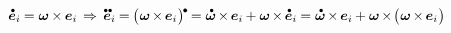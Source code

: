 \begin{otherlanguage}{russian}
\nopagebreak\begin{equation*}
\mathdotabove{\bm{e}}_i \hspace{-0.1ex} = \bm{\omega} \hspace{-0.1ex} \times \hspace{-0.12ex} \bm{e}_i
\hspace{.33ex} \Rightarrow \hspace{.4ex}
\mathdotdotabove{\bm{e}}_i \hspace{-0.1ex}
= \hspace{-0.15ex} \bigl( \hspace{.1ex} \bm{\omega} \hspace{-0.2ex} \times \hspace{-0.2ex} \bm{e}_i \hspace{.1ex} \bigr)^{ \hspace{-0.15ex} \tikz[baseline=-0.2ex] \draw[black, fill=black] (0,0) circle (.28ex); } \hspace{-0.15ex}
= \mathdotabove{\bm{\omega}} \hspace{-0.2ex} \times \hspace{-0.2ex} \bm{e}_i \hspace{-0.1ex} + \bm{\omega} \hspace{-0.2ex} \times \hspace{-0.2ex} \mathdotabove{\bm{e}}_i \hspace{-0.1ex}
= \mathdotabove{\bm{\omega}} \hspace{-0.2ex} \times \hspace{-0.2ex} \bm{e}_i \hspace{-0.1ex}
+ \bm{\omega} \hspace{-0.2ex} \times \hspace{-0.33ex} \bigl( \hspace{.1ex} \bm{\omega} \hspace{-0.2ex} \times \hspace{-0.2ex} \bm{e}_i \hspace{.1ex} \bigr)
\end{equation*}


\end{otherlanguage}
